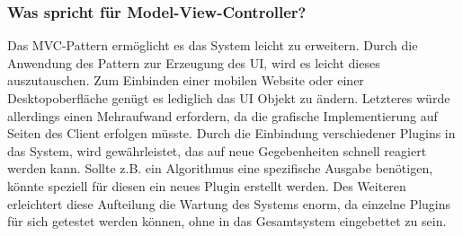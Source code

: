\clearpage

\subsubsection{Was spricht für Model-View-Controller?}
Das MVC-Pattern ermöglicht es das System leicht zu erweitern. Durch die Anwendung des Pattern zur Erzeugung des UI, wird es leicht dieses auszutauschen. Zum Einbinden einer mobilen Website oder einer Desktopoberfläche genügt es lediglich das UI Objekt zu ändern. Letzteres würde allerdings einen Mehraufwand erfordern, da die grafische Implementierung auf Seiten des Client erfolgen müsste.
Durch die Einbindung verschiedener Plugins in das System, wird gewährleistet, das auf neue Gegebenheiten schnell reagiert werden kann.
Sollte z.B. ein Algorithmus eine spezifische Ausgabe benötigen, könnte speziell für diesen ein neues Plugin erstellt werden. 
Des Weiteren erleichtert diese Aufteilung die Wartung des Systems enorm, da einzelne Plugins für sich getestet werden können, ohne in das Gesamtsystem eingebettet zu sein. 

